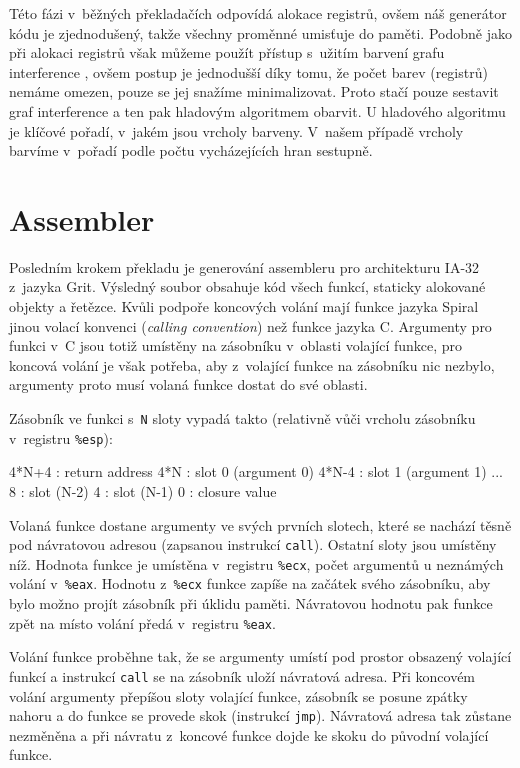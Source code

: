 Této fázi v~běžných překladačích odpovídá alokace registrů, ovšem náš generátor
kódu je zjednodušený, takže všechny proměnné umisťuje do paměti. Podobně jako
při alokaci registrů však můžeme použít přístup s~užitím barvení grafu
interference
\cite{chaitin1981register,chaitin1982register,briggs1994improvements}, ovšem
postup je jednodušší díky tomu, že počet barev (registrů) nemáme omezen, pouze
se jej snažíme minimalizovat. Proto stačí pouze sestavit graf interference a ten
pak hladovým algoritmem obarvit. U hladového algoritmu je klíčové pořadí,
v~jakém jsou vrcholy barveny. V~našem případě vrcholy barvíme v~pořadí podle
počtu vycházejících hran sestupně.

\section{Assembler}

Posledním krokem překladu je generování assembleru pro architekturu IA-32
z~jazyka Grit. Výsledný soubor obsahuje kód všech funkcí, staticky alokované
objekty a řetězce.  Kvůli podpoře koncových volání mají funkce jazyka Spiral
jinou volací konvenci (\emph{calling convention}) než funkce jazyka C. Argumenty
pro funkci v~C jsou totiž umístěny na zásobníku v~oblasti volající funkce, pro
koncová volání je však potřeba, aby z~volající funkce na zásobníku nic nezbylo,
argumenty proto musí volaná funkce dostat do své oblasti.

Zásobník ve funkci s~\texttt{N} sloty vypadá takto (relativně vůči vrcholu
zásobníku v~registru \texttt{\%esp}):

\begin{ttcode}
  4*N+4  :  return address
    4*N  :  slot 0 (argument 0)
  4*N-4  :  slot 1 (argument 1)
            ...
      8  :  slot (N-2)
      4  :  slot (N-1)
      0  :  closure value
\end{ttcode}

Volaná funkce dostane argumenty ve svých prvních slotech, které se nachází těsně
pod návratovou adresou (zapsanou instrukcí \texttt{call}). Ostatní sloty jsou
umístěny níž. Hodnota funkce je umístěna v~registru \texttt{\%ecx}, počet
argumentů u neznámých volání v~\texttt{\%eax}. Hodnotu z~\texttt{\%ecx} funkce
zapíše na začátek svého zásobníku, aby bylo možno projít zásobník při úklidu
paměti.  Návratovou hodnotu pak funkce zpět na místo volání předá v~registru
\texttt{\%eax}.

Volání funkce proběhne tak, že se argumenty umístí pod prostor obsazený volající
funkcí a instrukcí \texttt{call} se na zásobník uloží návratová adresa.  Při
koncovém volání argumenty přepíšou sloty volající funkce, zásobník se posune
zpátky nahoru a do funkce se provede skok (instrukcí \texttt{jmp}). Návratová
adresa tak zůstane nezměněna a při návratu z~koncové funkce dojde ke skoku do
původní volající funkce.

